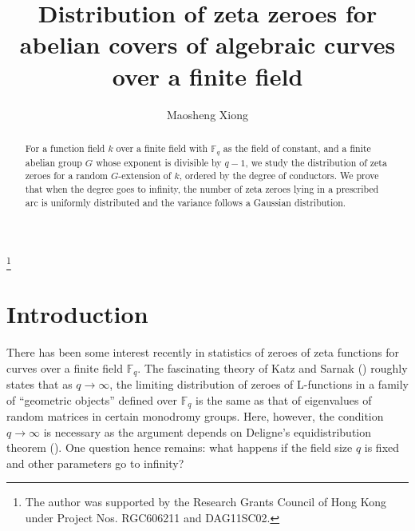 \documentclass[12pt]{amsart}
\theoremstyle{plain}
\begin{document}
\title[Zeta zeroes of abelian covers of algebraic curves]{Distribution of zeta zeroes for abelian covers of algebraic curves over a finite field}

\author[M. Xiong]{\sc Maosheng Xiong}

\thanks{The author was supported by the Research Grants Council of Hong Kong under Project Nos. RGC606211 and DAG11SC02.}

\begin{abstract}

For a function field $k$ over a finite field with ${{\mathbb F}_q}$ as the field of constant, and a finite abelian group $G$ whose exponent is divisible by $q-1$, we study the distribution of zeta zeroes for a random $G$-extension of $k$, ordered by the degree of conductors. We prove that when the degree goes to infinity, the number of zeta zeroes lying in a prescribed arc is uniformly distributed and the variance follows a Gaussian distribution.
\end{abstract}

\maketitle

\thispagestyle{empty}

\maketitle

\thispagestyle{empty}

\section{Introduction}

There has been some interest recently in statistics of zeroes of zeta functions for curves over a finite field ${{\mathbb F}_q}$. The fascinating theory of Katz and Sarnak (\cite{kat}) roughly states that as $q \to \infty$, the limiting distribution of zeroes of L-functions in a family of ``geometric objects'' defined over ${{\mathbb F}_q}$ is the same as that of eigenvalues of random matrices in certain monodromy groups. Here, however, the condition $q \to \infty$ is necessary as the argument depends on Deligne's equidistribution theorem (\cite{Del74}). One question hence remains: what happens if the field size $q$ is fixed and other parameters go to infinity?
\end{document}
